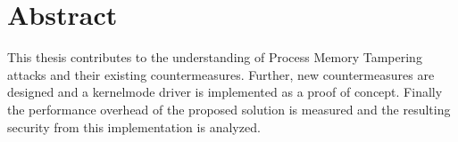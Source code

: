 \newpage
\thispagestyle{empty}
\section*{Abstract}
This thesis contributes to the understanding of Process Memory Tampering attacks and their existing countermeasures. Further, new countermeasures are designed and a kernelmode driver is implemented as a proof of concept. Finally the performance overhead of the proposed solution is measured and the resulting security from this implementation is analyzed.